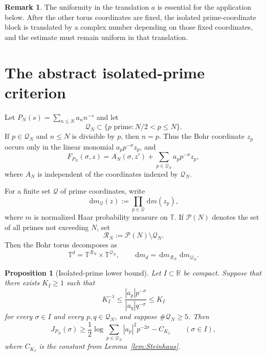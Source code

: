\documentclass[11pt]{article}
\newtheorem{proposition}[theorem]{Proposition}
\theoremstyle{definition}
\newtheorem{remark}[theorem]{Remark}
\newcommand{\R}{\mathbb R}
\newcommand{\T}{\mathbb T}
\newcommand{\dd}{\,\mathrm d}
\newcommand{\1}{\mathbf 1}
\begin{document}
\begin{remark}\label{rem:translation-important}
The uniformity in the translation $a$ is essential for the application below.  After the other torus coordinates are fixed, the isolated prime-coordinate block is translated by a complex number depending on those fixed coordinates, and the estimate must remain uniform in that translation.
\end{remark}

\section{The abstract isolated-prime criterion}\label{sec:abstract}

Let $P_N(s)=\sum_{n\le N}a_n n^{-s}$ and let
\[
\mathcal Q_N\subset\{p\text{ prime}:N/2<p\le N\}.
\]
If $p\in\mathcal Q_N$ and $n\le N$ is divisible by $p$, then $n=p$.  Thus the Bohr coordinate $z_p$ occurs only in the linear monomial $a_pp^{-\sigma}z_p$, and
\begin{equation}\label{eq:isolated-decomposition}
F_{P_N}(\sigma,z)
=A_N(\sigma,z')
+\sum_{p\in\mathcal Q_N}a_pp^{-\sigma}z_p,
\end{equation}
where $A_N$ is independent of the coordinates indexed by $\mathcal Q_N$.

For a finite set $\mathcal Q$ of prime coordinates, write
\[
\dd m_{\mathcal Q}(z)
:=\prod_{p\in\mathcal Q}\dd m(z_p),
\]
where $m$ is normalized Haar probability measure on $\T$.  If $\mathcal P(N)$ denotes the set of all primes not exceeding $N$, set
\[
\mathcal R_N:=\mathcal P(N)\setminus\mathcal Q_N.
\]
Then the Bohr torus decomposes as
\[
\T^d=\T^{\mathcal R_N}\times\T^{\mathcal Q_N},
\qquad
\dd m_d=\dd m_{\mathcal R_N}\,\dd m_{\mathcal Q_N}.
\]

\begin{proposition}[Isolated-prime lower bound]\label{prop:isolated-lower-general}
Let $I\subset\R$ be compact.  Suppose that there exists $K_I\ge1$ such that
\begin{equation}\label{eq:isolated-comparable-general}
K_I^{-1}
\le
\frac{|a_p|p^{-\sigma}}{|a_q|q^{-\sigma}}
\le K_I
\end{equation}
for every $\sigma\in I$ and every $p,q\in\mathcal Q_N$, and suppose $\#\mathcal Q_N\ge5$.  Then
\begin{equation}\label{eq:isolated-lower-general}
J_{P_N}(\sigma)
\ge
\frac12\log\sum_{p\in\mathcal Q_N}|a_p|^2p^{-2\sigma}
-C_{K_I}
\qquad(\sigma\in I),
\end{equation}
where $C_{K_I}$ is the constant from Lemma~\ref{lem:Steinhaus}.
\end{proposition}
\end{document}
